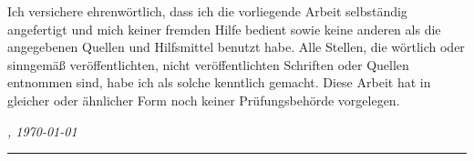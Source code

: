 %
\label{sec:declaration}
\thispagestyle{empty}

Ich versichere ehrenwörtlich, dass ich die vorliegende Arbeit selbständig angefertigt und mich keiner fremden Hilfe bedient sowie keine anderen als die angegebenen Quellen und Hilfsmittel benutzt habe.
Alle Stellen, die wörtlich oder sinngemäß veröffentlichten, nicht veröffentlichten Schriften oder Quellen entnommen sind, habe ich als solche kenntlich gemacht.
Diese Arbeit hat in gleicher oder ähnlicher Form noch keiner Prüfungsbehörde vorgelegen.

\bigskip

\noindent\textit{\thesisUniversityCity, \large\today}

\smallskip

\begin{flushright}
	\begin{minipage}{5cm}
		\rule{\textwidth}{1pt}
		\centering\thesisName
	\end{minipage}
\end{flushright}

